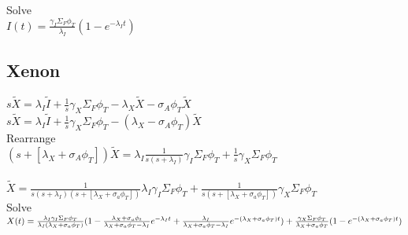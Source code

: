 \documentclass[11pt,a4paper]{article}
\begin{document}
\noindent Solve \\
$I(t)=\frac{\gamma_I\Sigma_F\phi_T}{\lambda_I}(1-e^{-\lambda_I t})$

\subsection{Xenon}
$s\tilde{X}=\lambda_I\tilde{I}+\frac{1}{s}\gamma_X\Sigma_F\phi_T-\lambda_X\tilde{X}-\sigma_A\phi_T\tilde{X}$ \\
$s\tilde{X}=\lambda_I\tilde{I}+\frac{1}{s}\gamma_X\Sigma_F\phi_T-(\lambda_X-\sigma_A\phi_T)\tilde{X}$ \\

\noindent Rearrange \\
$(s+[\lambda_X+\sigma_A\phi_T])\tilde{X}=\lambda_I\frac{1}{s(s+\lambda_I)}\gamma_I\Sigma_F\phi_T+\frac{1}{s}\gamma_X\Sigma_F\phi_T$ \\ \\
$\tilde{X}=\frac{1}{s(s+\lambda_I)(s+[\lambda_X+\sigma_a\phi_T])}\lambda_I\gamma_I\Sigma_F\phi_T+\frac{1}{s(s+[\lambda_X+\sigma_a\phi_T])}\gamma_X\Sigma_F\phi_T$ \\

\noindent Solve \\
$X(t)=\frac{\lambda_I\gamma_I\Sigma_F\phi_T}{\lambda_I(\lambda_X+\sigma_a\phi_T)}(1-\frac{\lambda_X+\sigma_a\phi_t}{\lambda_X+\sigma_a\phi_T-\lambda_I}e^{-\lambda_It}+\frac{\lambda_I}{\lambda_X+\sigma_a\phi_T-\lambda_I}e^{-(\lambda_X+\sigma_a\phi_T)t}) \\
+ \frac{\gamma_X\Sigma_F\phi_T}{\lambda_X+\sigma_a\phi_T}(1-e^{-(\lambda_X+\sigma_a\phi_T)t})$
\end{document}

